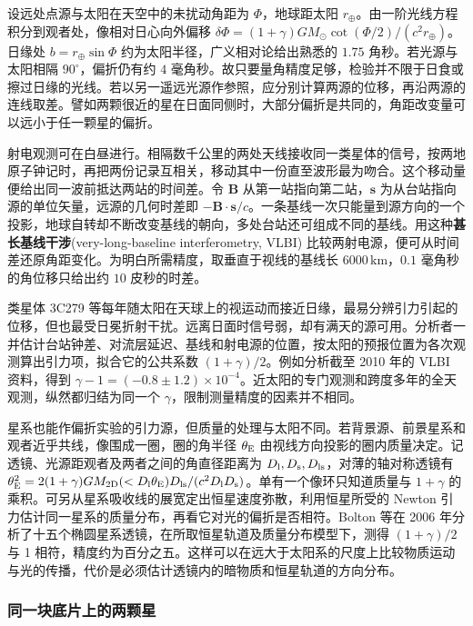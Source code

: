 设远处点源与太阳在天空中的未扰动角距为 $\Phi$，地球距太阳 $r_\oplus$。由一阶光线方程积分到观者处，像相对日心向外偏移 $\delta\Phi=(1+\gamma)GM_\odot\cot(\Phi/2)/(c^2r_\oplus)$。日缘处 $b=r_\oplus\sin\Phi$ 约为太阳半径，广义相对论给出熟悉的 $1.75$ 角秒。若光源与太阳相隔 $90^\circ$，偏折仍有约 $4$ 毫角秒。故只要量角精度足够，检验并不限于日食或擦过日缘的光线。若以另一遥远光源作参照，应分别计算两源的位移，再沿两源的连线取差。譬如两颗很近的星在日面同侧时，大部分偏折是共同的，角距改变量可以远小于任一颗星的偏折。

射电观测可在白昼进行。相隔数千公里的两处天线接收同一类星体的信号，按两地原子钟记时，再把两份记录互相关，移动其中一份直至波形最为吻合。这个移动量便给出同一波前抵达两站的时间差。令 $\bm B$ 从第一站指向第二站，$\bm s$ 为从台站指向源的单位矢量，远源的几何时差即 $-\bm B\cdot\bm s/c$。一条基线一次只能量到源方向的一个投影，地球自转却不断改变基线的朝向，多处台站还可组成不同的基线。用这种\textbf{甚长基线干涉}(very-long-baseline interferometry, VLBI) 比较两射电源，便可从时间差还原角距变化。为明白所需精度，取垂直于视线的基线长 $6000\,\mathrm{km}$，$0.1$ 毫角秒的角位移只给出约 $10$ 皮秒的时差。

类星体 3C279 等每年随太阳在天球上的视运动而接近日缘，最易分辨引力引起的位移，但也最受日冕折射干扰。远离日面时信号弱，却有满天的源可用。分析者一并估计台站钟差、对流层延迟、基线和射电源的位置，按太阳的预报位置为各次观测算出引力项，拟合它的公共系数 $(1+\gamma)/2$。例如分析截至 2010 年的 VLBI 资料，得到 $\gamma-1=(-0.8\pm1.2)\times10^{-4}$。近太阳的专门观测和跨度多年的全天观测，纵然都归结为同一个 $\gamma$，限制测量精度的因素并不相同。

星系也能作偏折实验的引力源，但质量的处理与太阳不同。若背景源、前景星系和观者近乎共线，像围成一圈，圈的角半径 $\theta_{\rm E}$ 由视线方向投影的圈内质量决定。记透镜、光源距观者及两者之间的角直径距离为 $D_{\rm l},D_{\rm s},D_{\rm ls}$，对薄的轴对称透镜有 $\theta_{\rm E}^2=2(1+\gamma)GM_{\rm 2D}(<D_{\rm l}\theta_{\rm E})D_{\rm ls}/(c^2D_{\rm l}D_{\rm s})$。单有一个像环只知道质量与 $1+\gamma$ 的乘积。可另从星系吸收线的展宽定出恒星速度弥散，利用恒星所受的 Newton 引力估计同一星系的质量分布，再看它对光的偏折是否相符。Bolton 等在 2006 年分析了十五个椭圆星系透镜，在所取恒星轨道及质量分布模型下，测得 $(1+\gamma)/2$ 与 1 相符，精度约为百分之五。这样可以在远大于太阳系的尺度上比较物质运动与光的传播，代价是必须估计透镜内的暗物质和恒星轨道的方向分布。

\subsubsection{同一块底片上的两颗星}

